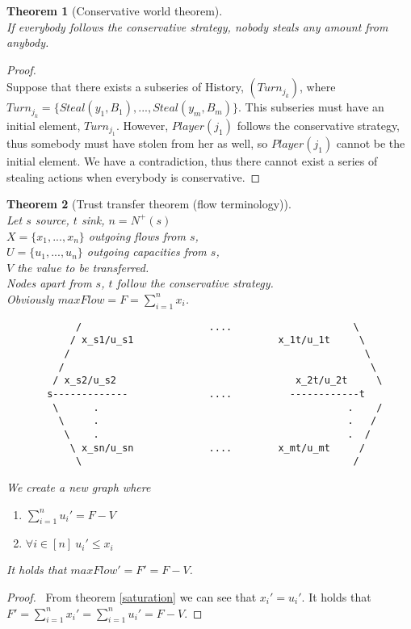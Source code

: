 \documentclass[11pt]{article}
\newtheorem{theorem}{Theorem}[section]
\theoremstyle{definition}
\theoremstyle{corollary}
\theoremstyle{lemma}
\begin{document}
    \begin{theorem}[Conservative world theorem] \ \\
       \label{conservativeworld}
       If everybody follows the conservative strategy, nobody steals any amount from anybody.
    \end{theorem}
    \begin{proof} \ \\
       Suppose that there exists a subseries of History, $(Turn_{j_k})$, where $Turn_{j_k} = \{Steal(y_1,B_1),...,
       Steal(y_m,B_m)\}$. This subseries must have an initial element, $Turn_{j_1}$. However, $Player(j_1)$ follows the conservative
       strategy, thus somebody must have stolen from her as well, so $Player(j_1)$ cannot be the initial element. We have a
       contradiction, thus there cannot exist a series of stealing actions when everybody is conservative.
    \end{proof}

    \begin{theorem}[Trust transfer theorem (flow terminology)] \ \\
       \label{trusttransfer}
       Let $s$ source, $t$ sink, $n = N^{+}(s)$ \\
       $X = \{x_1, ..., x_n\}$ outgoing flows from $s$, \\
       $U = \{u_1, ..., u_n\}$ outgoing capacities from $s$, \\
       $V$ the value to be transferred. \\
       Nodes apart from $s$, $t$ follow the conservative strategy. \\
       Obviously $maxFlow = F = \sum\limits_{i=1}^{n}{x_i}$.
       {\em \begin{lstlisting}
            /                      ....                     \
           / x_s1/u_s1                         x_1t/u_1t     \
          /                                                   \
         /                                                     \
        / x_s2/u_s2                               x_2t/u_2t     \
       s-------------              ....          ------------t
        \      .                                           .    /
         \     .                                           .   /
          \    .                                           .  /
           \ x_sn/u_sn             ....        x_mt/u_mt     /
            \                                               /
       \end{lstlisting}}
       We create a new graph where
       \begin{enumerate}
         \item  $\sum\limits_{i=1}^{n}{u_i'} = F - V$
         \item $\forall i \in [n] \: u_i' \leq x_i$
       \end{enumerate}
 
       It holds that $maxFlow' = F' = F - V$.
    \end{theorem}
    \begin{proof} \
        From theorem \ref{saturation} we can see that $x_i' = u_i'$. It holds that $F' = \sum\limits_{i=1}^nx_i' =
        \sum\limits_{i=1}^nu_i' = F - V$.
    \end{proof}
\end{document}
